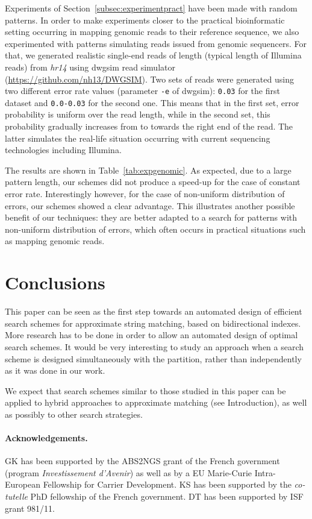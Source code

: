 \documentclass[12pt]{article}
\begin{document}
Experiments of Section~\ref{subsec:experimentpract} have been made with
random patterns. In order to make experiments closer to 
the practical bioinformatic setting 
occurring in mapping genomic reads to their
reference sequence, we also experimented with patterns simulating
reads issued from genomic sequencers. For that, 
we generated realistic single-end reads of length  (typical length of {\sc
  Illumina} reads) from \emph{hr14} 
using {\sc dwgsim} read simulator
(\url{https://github.com/nh13/DWGSIM}). Two sets of reads were
generated using two different error rate
values (parameter \texttt{-e} of {\sc dwgsim}): \texttt{0.03} for the
first dataset and \texttt{0.0-0.03} for the second one. This means
that in the first set, error probability is uniform over the read
length, while in the second set, this probability gradually increases from 
to  towards the right end of the read. The latter simulates
the real-life situation occurring with current sequencing
technologies including {\sc Illumina}. 


The results are shown in Table~\ref{tab:expgenomic}. As expected, due
to a large pattern length, our schemes did not produce a speed-up for
the case of constant error rate. 
Interestingly however,
for the case of non-uniform distribution of errors, our schemes showed
a clear advantage. 
This illustrates another possible benefit of our techniques: they are
better adapted to a search for patterns with non-uniform
distribution of errors, which often occurs in practical situations
such as mapping genomic reads. 

\section{Conclusions} This paper can be seen as the first step towards an automated design
of efficient search schemes for approximate string matching, based on
bidirectional indexes. More research has to be done in order to allow
an automated design of optimal search schemes. 
It would be very interesting to study an approach when a search scheme
is designed simultaneously with the partition, rather than
independently as it was done in our work. 

We expect that search schemes similar to those studied in this paper
can be applied to hybrid approaches to approximate matching (see Introduction), as well
as possibly to other search strategies. 





\paragraph{Acknowledgements.}
GK has been supported by the ABS2NGS grant of the French government
(program \emph{Investissement d'Avenir}) as well as by a EU Marie-Curie
Intra-European Fellowship for Carrier Development.
KS has been supported by the \emph{co-tutelle} PhD fellowship of the French
government.
DT has been supported by ISF grant 981/11.


\end{document}
